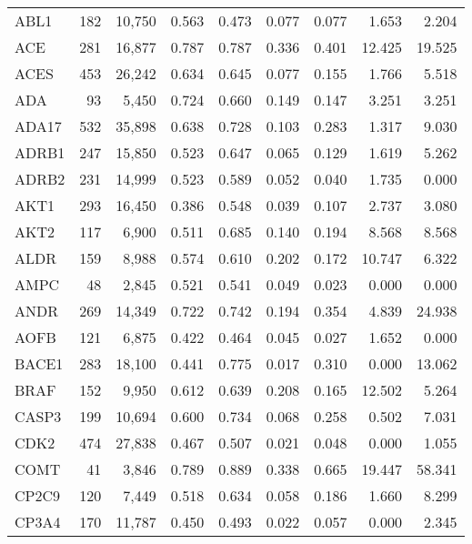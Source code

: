 \begin{center}
\begin{longtable}{lrrrrrrrr}
		ABL1   & 182   & 10,750   & 0.563   & 0.473   & 0.077   & 0.077   & 1.653   & 2.204  \\
		ACE    & 281   & 16,877   & 0.787   & 0.787   & 0.336   & 0.401   & 12.425  & 19.525 \\
		ACES   & 453   & 26,242   & 0.634   & 0.645   & 0.077   & 0.155   & 1.766   & 5.518  \\
		ADA    & 93    & 5,450    & 0.724   & 0.660   & 0.149   & 0.147   & 3.251   & 3.251  \\
		ADA17  & 532   & 35,898   & 0.638   & 0.728   & 0.103   & 0.283   & 1.317   & 9.030  \\
		ADRB1  & 247   & 15,850   & 0.523   & 0.647   & 0.065   & 0.129   & 1.619   & 5.262  \\
		ADRB2  & 231   & 14,999   & 0.523   & 0.589   & 0.052   & 0.040   & 1.735   & 0.000  \\
		AKT1   & 293   & 16,450   & 0.386   & 0.548   & 0.039   & 0.107   & 2.737   & 3.080  \\
		AKT2   & 117   & 6,900    & 0.511   & 0.685   & 0.140   & 0.194   & 8.568   & 8.568  \\
		ALDR   & 159   & 8,988    & 0.574   & 0.610   & 0.202   & 0.172   & 10.747  & 6.322  \\
		AMPC   & 48    & 2,845    & 0.521   & 0.541   & 0.049   & 0.023   & 0.000   & 0.000  \\
		ANDR   & 269   & 14,349   & 0.722   & 0.742   & 0.194   & 0.354   & 4.839   & 24.938 \\
		AOFB   & 121   & 6,875    & 0.422   & 0.464   & 0.045   & 0.027   & 1.652   & 0.000  \\
		BACE1  & 283   & 18,100   & 0.441   & 0.775   & 0.017   & 0.310   & 0.000   & 13.062 \\
		BRAF   & 152   & 9,950    & 0.612   & 0.639   & 0.208   & 0.165   & 12.502  & 5.264  \\
		CASP3  & 199   & 10,694   & 0.600   & 0.734   & 0.068   & 0.258   & 0.502   & 7.031  \\
		CDK2   & 474   & 27,838   & 0.467   & 0.507   & 0.021   & 0.048   & 0.000   & 1.055  \\
		COMT   & 41    & 3,846    & 0.789   & 0.889   & 0.338   & 0.665   & 19.447  & 58.341 \\
		CP2C9  & 120   & 7,449    & 0.518   & 0.634   & 0.058   & 0.186   & 1.660   & 8.299  \\
		CP3A4  & 170   & 11,787   & 0.450   & 0.493   & 0.022   & 0.057   & 0.000   & 2.345  \\

\end{longtable}
\end{center}
